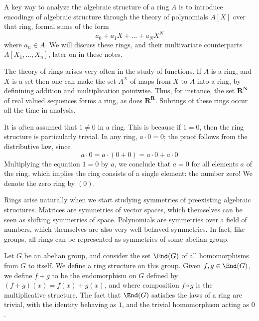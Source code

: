 \begin{example}
    A key way to analyze the algebraic structure of a ring $A$ is to introduce encodings of algebraic structure through the theory of polynomials $A[X]$ over that ring, formal sums of the form
    \[ a_0 + a_1X + \dots + a_NX^N \]
    where $a_n \in A$. We will discuss these rings, and their multivariate counterparts $A[X_1, \dots, X_n]$, later on in these notes.
\end{example}

\begin{example}
    The theory of rings arises very often in the study of functions. If $A$ is a ring, and $X$ is a set then one can make the set $A^X$ of maps from $X$ to $A$ into a ring, by definining addition and multiplication pointwise. Thus, for instance, the set $\mathbf{R}^{\mathbf{N}}$ of real valued sequences forms a ring, as does $\mathbf{R}^{\mathbf{R}}$. Subrings of these rings occur all the time in analysis.
\end{example}

\begin{remark}
    It is often assumed that $1 \neq 0$ in a ring. This is because if $1 = 0$, then the ring structure is particularly trivial. In any ring, $a \cdot 0 = 0$; the proof follows from the distributive law, since
    \[ a \cdot 0 = a \cdot (0 + 0) = a \cdot 0 + a \cdot 0 \]
    Multiplying the equation $1 = 0$ by $a$, we conclude that $a = 0$ for all elements $a$ of the ring, which implies the ring consists of a single element: the number zero! We denote the zero ring by $(0)$.
\end{remark}

Rings arise naturally when we start studying symmetries of preexisting algebraic structures. Matrices are symmetries of vector spaces, which themselves can be seen as shifting symmetries of space. Polynomials are symmetries over a field of numbers, which themselves are also very well behaved symmetries. In fact, like groups, all rings can be represented as symmetries of some abelian group.

\begin{example}
    Let $G$ be an abelian group, and consider the set $\End(G)$ of all homomorphisms from $G$ to itself. We define a ring structure on this group. Given $f,g \in \End(G)$, we define $f+g$ to be the endomorphism on $G$ defined by $(f + g)(x) = f(x) + g(x)$, and where composition $f \circ g$ is the multiplicative structure. The fact that $\End(G)$ satisfies the laws of a ring are trivial, with the identity behaving as $1$, and the trivial homomorphism acting as $0$.
\end{example}

